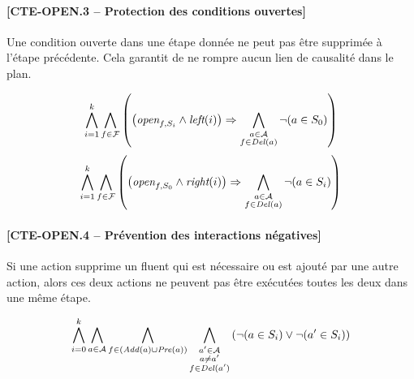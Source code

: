  \paragraph*{[CTE-OPEN.3 -- Protection des conditions ouvertes]}

Une condition ouverte dans une étape donnée ne peut pas être supprimée à l'étape précédente. Cela garantit de ne rompre aucun lien de causalité dans le plan.

\begin{small}
\[ \bigwedge\limits_{\substack{i=1}}^{k} \bigwedge\limits_{\substack{f\in \mathcal{F}}}\left(\left(\textit{open}_{f,S_{i}} \wedge \textit{left}(i) \right) \Rightarrow \bigwedge\limits_{\substack{a \in \mathcal{A}\\ f \in \mathit{Del}(a)}}\neg (a \in S_{0})\right) \]
\[ \bigwedge\limits_{\substack{i=1}}^{k} \bigwedge\limits_{\substack{f \in \mathcal{F}}} \left(\left(\textit{open}_{f,S_{0}} \wedge \textit{right}(i) \right) \Rightarrow \bigwedge\limits_{\substack{a \in \mathcal{A} \\ f \in \mathit{Del}(a)}}\neg (a \in S_{i})\right) \]
\end{small}

\paragraph*{[CTE-OPEN.4 -- Prévention des interactions négatives]}

Si une action supprime un fluent qui est nécessaire ou est ajouté par une autre action, alors ces deux actions ne peuvent pas être exécutées toutes les deux dans une même étape.

\begin{small}
\[ \bigwedge\limits_{\substack{i=0}}^{k} \bigwedge\limits_{\substack{a \in \mathcal{A}}} \bigwedge\limits_{\substack{f\in \left(\mathit{Add}(a) \cup \mathit{Pre}(a)\right)}} \bigwedge\limits_{\substack{a' \in \mathcal{A} \\ a \neq a' \\ f \in \mathit{Del}(a')}}\left(\neg (a \in S_{i}) \vee \neg (a' \in S_{i})\right) \]
\end{small}